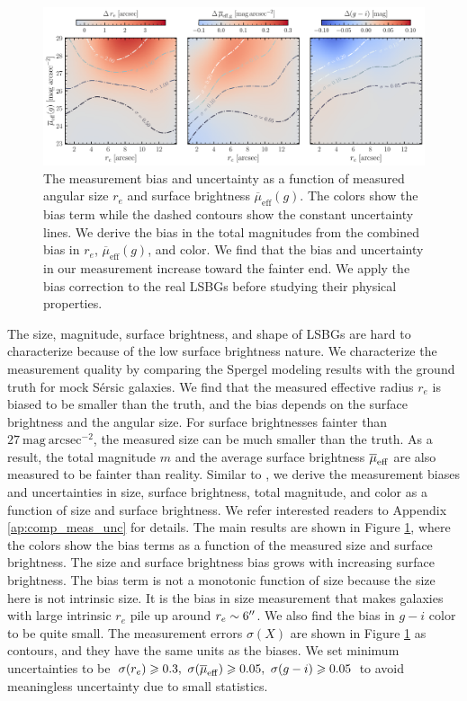 \documentclass[twocolumn,astrosymb,twocolappendix]{aastex631}
\newcommand{\sbunit}{\mathrm{mag\ arcsec}^{-2}}
\newcommand{\sbeff}{\overline{\mu}_{\mathrm{eff}}(g)}
\newcommand{\sersic}{S\'ersic}
\begin{document}
\begin{CJK*}{UTF8}{gbsn}
\begin{figure}
	\vbox{ 
		\centering
		\includegraphics[width=1\linewidth]{meas_error_spergel.pdf}
	}
    \caption{The measurement bias and uncertainty as a function of measured angular size $r_e$ and surface brightness $\sbeff$. The colors show the bias term while the dashed contours show the constant uncertainty lines. We derive the bias in the total magnitudes from the combined bias in $r_e$, $\sbeff$, and color. We find that the bias and uncertainty in our measurement increase toward the fainter end. We apply the bias correction to the real LSBGs before studying their physical properties.}
    \label{fig:meas_err}
\end{figure}

\vspace{1em}

The size, magnitude, surface brightness, and shape of LSBGs are hard to characterize because of the low surface brightness nature. We characterize the measurement quality by comparing the Spergel modeling results with the ground truth for mock \sersic{} galaxies. We find that the measured effective radius $r_e$ is biased to be smaller than the truth, and the bias depends on the surface brightness and the angular size. For surface brightnesses fainter than $27\ \sbunit$, the measured size can be much smaller than the truth. As a result, the total magnitude $m$ and the average surface brightness $\overline{\mu}_{\rm eff}$ are also measured to be fainter than reality. Similar to \citet{Zaritsky2021}, we derive the measurement biases and uncertainties in size, surface brightness, total magnitude, and color as a function of size and surface brightness. We refer interested readers to Appendix \ref{ap:comp_meas_unc} for details. The main results are shown in Figure \ref{fig:meas_err}, where the colors show the bias terms as a function of the measured size and surface brightness. The size and surface brightness bias grows with increasing surface brightness. The bias term is not a monotonic function of size because the size here is not intrinsic size. It is the bias in size measurement that makes galaxies with large intrinsic $r_e$ pile up around $r_e\sim 6\mbox{$^{\prime\prime}$}$. We also find the bias in $g-i$ color to be quite small. The measurement errors $\sigma(X)$ are shown in Figure \ref{fig:meas_err} as contours, and they have the same units as the biases. We set minimum uncertainties to be $\sigma(r_e) \geqslant 0.3,\ \sigma(\overline{\mu}_{\rm eff}) \geqslant 0.05,\ \sigma(g-i) \geqslant 0.05$ to avoid meaningless uncertainty due to small statistics. 


\end{CJK*}
\end{document}
